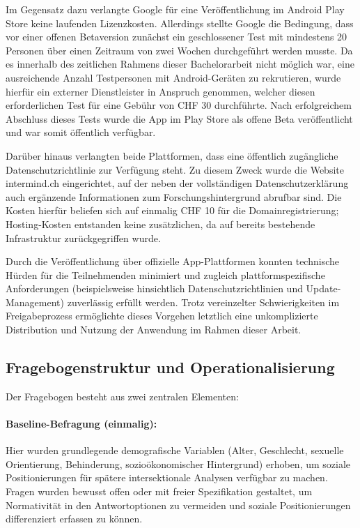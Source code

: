 Im Gegensatz dazu verlangte Google für eine Veröffentlichung im Android Play Store keine laufenden Lizenzkosten. Allerdings stellte Google die Bedingung, dass vor einer offenen Betaversion zunächst ein geschlossener Test mit mindestens 20 Personen über einen Zeitraum von zwei Wochen durchgeführt werden musste. Da es innerhalb des zeitlichen Rahmens dieser Bachelorarbeit nicht möglich war, eine ausreichende Anzahl Testpersonen mit Android-Geräten zu rekrutieren, wurde hierfür ein externer Dienstleister in Anspruch genommen, welcher diesen erforderlichen Test für eine Gebühr von CHF 30 durchführte. Nach erfolgreichem Abschluss dieses Tests wurde die App im Play Store als offene Beta veröffentlicht und war somit öffentlich verfügbar.

Darüber hinaus verlangten beide Plattformen, dass eine öffentlich zugängliche Datenschutzrichtlinie zur Verfügung steht. Zu diesem Zweck wurde die Website intermind.ch eingerichtet, auf der neben der vollständigen Datenschutzerklärung auch ergänzende Informationen zum Forschungshintergrund abrufbar sind. Die Kosten hierfür beliefen sich auf einmalig CHF 10 für die Domainregistrierung; Hosting-Kosten entstanden keine zusätzlichen, da auf bereits bestehende Infrastruktur zurückgegriffen wurde.

Durch die Veröffentlichung über offizielle App-Plattformen konnten technische Hürden für die Teilnehmenden minimiert und zugleich plattformspezifische Anforderungen (beispielsweise hinsichtlich Datenschutzrichtlinien und Update-Management) zuverlässig erfüllt werden. Trotz vereinzelter Schwierigkeiten im Freigabeprozess ermöglichte dieses Vorgehen letztlich eine unkomplizierte Distribution und Nutzung der Anwendung im Rahmen dieser Arbeit.

\subsection{Fragebogenstruktur und Operationalisierung}

Der Fragebogen besteht aus zwei zentralen Elementen:

\paragraph{Baseline-Befragung (einmalig):}
Hier wurden grundlegende demografische Variablen (Alter, Geschlecht, sexuelle Orientierung, Behinderung, sozioökonomischer Hintergrund) erhoben, um soziale Positionierungen für spätere intersektionale Analysen verfügbar zu machen. Fragen wurden bewusst offen oder mit freier Spezifikation gestaltet, um Normativität in den Antwortoptionen zu vermeiden und soziale Positionierungen differenziert erfassen zu können.

